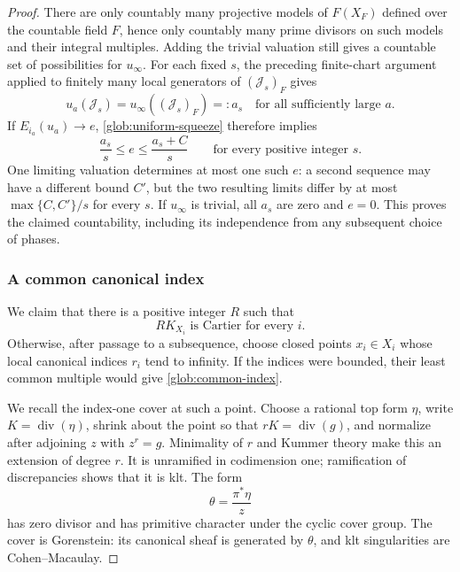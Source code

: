 \begin{proof}
There are only countably many projective models of $F(X_F)$ defined over
the countable field $F$, hence only countably many prime divisors on such
models and their integral multiples.  Adding the trivial valuation still
gives a countable set of possibilities for $u_\infty$.  For each fixed $s$,
the preceding finite-chart argument applied to finitely many local
generators of $(\mathcal J_s)_F$ gives
\[
 u_a(\mathcal J_s)=u_\infty((\mathcal J_s)_F)=:a_s
 \quad\text{for all sufficiently large }a.
\]
If $E_{i_a}(u_a)\to e$, \eqref{glob:uniform-squeeze} therefore implies
\begin{equation}\label{glob:unique-limit}
 \frac{a_s}{s}\leq e\leq\frac{a_s+C}{s}
 \qquad\text{for every positive integer }s.
\end{equation}
One limiting valuation determines at most one such $e$: a second sequence
may have a different bound $C'$, but the two resulting limits differ by at
most $\max\{C,C'\}/s$ for every $s$.  If $u_\infty$ is trivial, all $a_s$
are zero and $e=0$.  This proves the claimed countability, including its
independence from any subsequent choice of phases.

\subsubsection*{A common canonical index}
We claim that there is a positive integer $R$ such that
\begin{equation}\label{glob:common-index}
 RK_{X_i}\text{ is Cartier for every }i.
\end{equation}
Otherwise, after passage to a subsequence, choose closed points
$x_i\in X_i$ whose local canonical indices $r_i$ tend to infinity.  If the
indices were bounded, their least common multiple would give
\eqref{glob:common-index}.

We recall the index-one cover at such a point.  Choose a rational top form
$\eta$, write $K=\operatorname{div}(\eta)$, shrink about the point so that
$rK=\operatorname{div}(g)$, and normalize after adjoining $z$ with
$z^r=g$.  Minimality of $r$ and Kummer theory make this an extension of
degree $r$.  It is unramified in codimension one; ramification of
discrepancies shows that it is klt.  The form
\[
 \theta=\frac{\pi^*\eta}{z}
\]
has zero divisor and has primitive character under the cyclic cover group.
The cover is Gorenstein: its canonical sheaf is generated by $\theta$, and
klt singularities are Cohen--Macaulay.


\end{proof}
